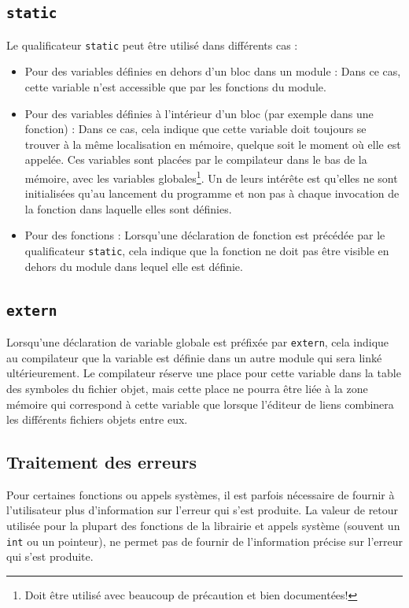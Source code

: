 \subsection{\texttt{static}}
Le qualificateur \texttt{static} peut être utilisé dans différents cas :
\begin{itemize}
  \item Pour des variables définies en dehors d'un bloc dans un module : Dans ce cas, cette variable n'est accessible que par les fonctions du module.
  \item Pour des variables définies à l'intérieur d'un bloc (par exemple dans une fonction) : Dans ce cas, cela indique que cette variable doit toujours se trouver à la même localisation en mémoire, quelque soit le moment où elle est appelée.
    Ces variables sont placées par le compilateur dans le bas de la mémoire, avec les variables globales\footnote{Doit être utilisé avec beaucoup de précaution et bien documentées!}.
    Un de leurs intérête est qu'elles ne sont initialisées qu'au lancement du programme et non pas à chaque invocation de la fonction dans laquelle elles sont définies.
  \item Pour des fonctions : Lorsqu'une déclaration de fonction est précédée par le qualificateur \texttt{static}, cela indique que la fonction ne doit pas être visible en dehors du module dans lequel elle est définie.
\end{itemize}

\subsection{\texttt{extern}}
Lorsqu'une déclaration de variable globale est préfixée par \texttt{extern}, cela indique au compilateur que la variable est définie dans un autre module qui sera linké ultérieurement.
Le compilateur réserve une place pour cette variable dans la table des symboles du fichier objet, mais cette place ne pourra être liée à la zone mémoire qui correspond à cette variable que lorsque l'éditeur de liens combinera les différents fichiers objets entre eux.


\subsection{Traitement des erreurs}
Pour certaines fonctions ou appels systèmes, il est parfois nécessaire de fournir à l'utilisateur plus d'information sur l'erreur qui s'est produite.
La valeur de retour utilisée pour la plupart des fonctions de la librairie et appels système (souvent un \texttt{int} ou un pointeur), ne permet pas de fournir de l'information précise sur l'erreur qui s'est produite.

